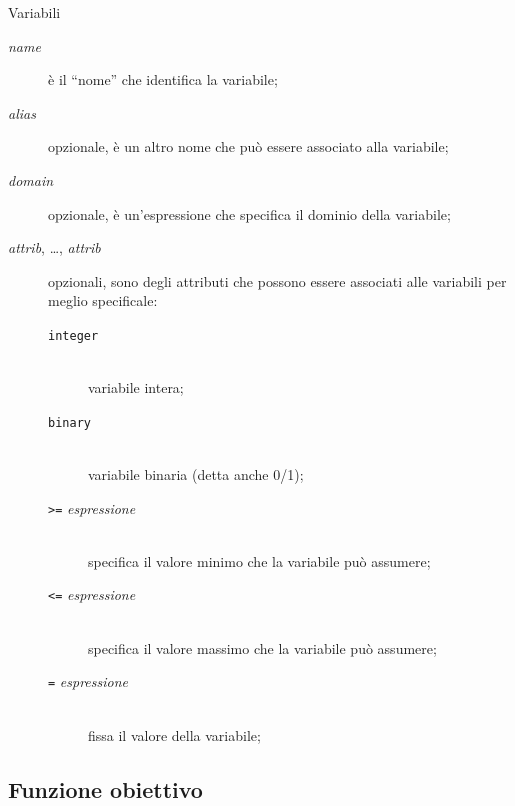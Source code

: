 \documentclass{beamer}
\begin{document}
\begin{frame}[allowframebreaks]{Variabili}
\noindent
{}

\medskip

\begin{description}
\item[{\it name}] \`e il ``nome'' che identifica la variabile;

\item[{\it alias}] opzionale, \`e un altro nome che pu\`o essere associato alla variabile;

\item[{\it domain}] opzionale, \`e un'espressione che specifica il dominio della variabile;

\item[{\it attrib}, \dots, {\it attrib}] opzionali, sono degli attributi che possono essere associati alle variabili per meglio specificale:
{\footnotesize \begin{description}
\item[{\tt integer}]\hspace*{0pt}\\
variabile intera;
\item[{\tt binary}]\hspace*{0pt}\\
variabile binaria (detta anche 0/1);
\item[{\tt>=} {\it espressione}]\hspace*{0pt}\\
specifica il valore minimo che la variabile pu\`o assumere;
\item[{\tt<=} {\it espressione}]\hspace*{0pt}\\
specifica il valore massimo che la variabile pu\`o assumere;
\item[{\tt=} {\it espressione}]\hspace*{0pt}\\
fissa il valore della variabile;
\end{description}}
\end{description}
\end{frame}

\subsection{Funzione obiettivo}
\end{document}
